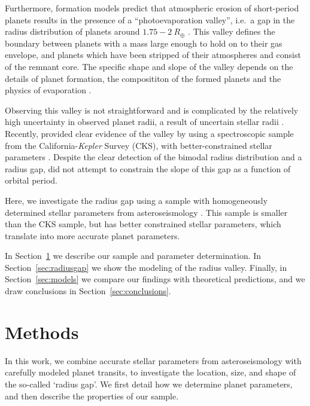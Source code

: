 \documentclass[a4paper,fleqn,usenatbib]{mnras}
\begin{document}
Furthermore, formation models predict that atmospheric erosion of short-period planets results in the presence of a ``photoevaporation valley'', i.e.\ a gap in the radius distribution of planets around $1.75-2~R_\oplus$ \citep{owen2013,jin2014,lopez2014,chen2016,lopez2016,owen2017}. This valley defines the boundary between planets with a mass large enough to hold on to their gas envelope, and planets which have been stripped of their atmospheres and consist of the remnant core. The specific shape and slope of the valley depends on the details of planet formation, the composititon of the formed planets and the physics of evaporation \citep[e.g.][]{lopez2016,owen2017}.

Observing this valley is not straightforward and is complicated by the relatively high uncertainty in observed planet radii, a result of uncertain stellar radii \citep{owen2013}. Recently, \cite{fulton2017} provided clear evidence of the valley by using a spectroscopic sample from the California-\textit{Kepler} Survey (CKS), with better-constrained stellar parameters \citep{petigura2017,johnson2017}. Despite the clear detection of the bimodal radius distribution and a radius gap, \cite{fulton2017} did not attempt to constrain the slope of this gap as a function of orbital period.

Here, we investigate the radius gap using a sample with homogeneously determined stellar parameters from asteroseismology \citep{silvaaguirre2015,lundkvist2016}. This sample is smaller than the CKS sample, but has better constrained stellar parameters, which translate into more accurate planet parameters.  

In Section~\ref{sec:methods} we describe our sample and parameter determination. In Section~\ref{sec:radiusgap} we show the modeling of the radius valley. Finally, in Section~\ref{sec:models} we compare our findings with theoretical predictions, and we draw conclusions in Section~\ref{sec:conclusions}.


\section{Methods}
\label{sec:methods}	

In this work, we combine accurate stellar parameters from asteroseismology \citep{silvaaguirre2015,lundkvist2016} with carefully modeled planet transits, to investigate the location, size, and shape of the so-called `radius gap'. We first detail how we determine planet parameters, and then describe the properties of our sample. 
\end{document}

